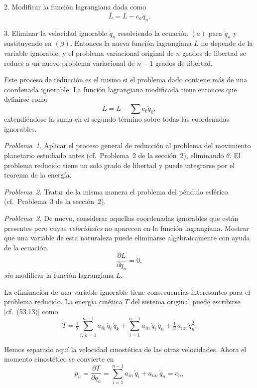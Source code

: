 \documentclass[12pt,a4paper]{book}
\begin{document}

2. Modificar la función lagrangiana dada como
\begin{equation}
\bar{L} = L - c_n \dot{q}_n. \tag*{$(\beta)$}
\end{equation}

3. Eliminar la velocidad ignorable $\dot{q}_n$ resolviendo la ecuación $(a)$ para $\dot{q}_n$ y sustituyendo en $(\beta)$. Entonces la nueva función lagrangiana $\bar{L}$ no depende de la variable ignorable, y el problema variacional original de $n$ grados de libertad se reduce a un nuevo problema variacional de $n-1$ grados de libertad.

Este proceso de reducción es el mismo si el problema dado contiene más de una coordenada ignorable. La función lagrangiana modificada tiene entonces que definirse como
\begin{equation}
\bar{L} = L - \sum c_k \dot{q}_k, \tag{54.12}
\end{equation}
extendiéndose la suma en el segundo término sobre todas las coordenadas ignorables.

\textit{Problema~1.} Aplicar el proceso general de reducción al problema del movimiento planetario estudiado antes (cf.\ Problema~2 de la sección~2), eliminando $\theta$. El problema reducido tiene un solo grado de libertad y puede integrarse por el teorema de la energía.

\textit{Problema~2.} Tratar de la misma manera el problema del péndulo esférico (cf.\ Problema~3 de la sección~2).

\textit{Problema~3.} De nuevo, considerar aquellas coordenadas ignorables que están presentes pero cuyas \textit{velocidades} no aparecen en la función lagrangiana. Mostrar que una variable de esta naturaleza puede eliminarse algebraicamente con ayuda de la ecuación
\[
\frac{\partial L}{\partial q_n} = 0,
\]
\textit{sin} modificar la función lagrangiana $L$.

La eliminación de una variable ignorable tiene consecuencias interesantes para el problema reducido. La energía cinética $T$ del sistema original puede escribirse [cf.\ (53.13)] como:
\begin{equation}
T = \tfrac{1}{2} \sum_{i,\,k=1}^{n-1} a_{ik}\,\dot{q}_i\,\dot{q}_k + \sum_{i=1}^{n-1} a_{in}\,\dot{q}_i\,\dot{q}_n + \tfrac{1}{2}\,a_{nn}\,\dot{q}_n^2. \tag{54.13}
\end{equation}

Hemos separado aquí la velocidad cinostética de las otras velocidades. Ahora el momento cinostético se convierte en
\begin{equation}
p_n = \frac{\partial T}{\partial \dot{q}_n} = \sum_{i=1}^{n-1} a_{in}\,\dot{q}_i + a_{nn}\,\dot{q}_n = c_n, \tag{54.14}
\end{equation}
\end{document}

